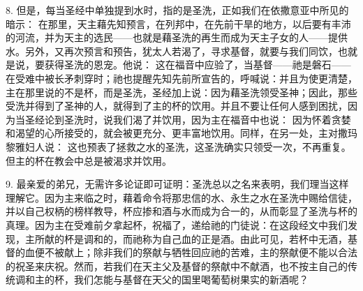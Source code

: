 8. 但是，每当圣经中单独提到水时，指的是圣洗，正如我们在依撒意亚中所见的暗示： 在那里，天主藉先知预言，在列邦中，在先前干旱的地方，以后要有丰沛的河流，并为天主的选民——也就是藉圣洗的再生而成为天主子女的人——提供水。另外，又再次预言和预告，犹太人若渴了，寻求基督，就要与我们同饮，也就是说，要获得圣洗的恩宠。他说： 这在福音中应验了，当基督——祂是磐石——在受难中被长矛刺穿时；祂也提醒先知先前所宣告的，呼喊说：并且为使更清楚，主在那里说的不是杯，而是圣洗，圣经加上说：因为藉圣洗领受圣神；因此，那些受洗并得到了圣神的人，就得到了主的杯的饮用。并且不要让任何人感到困扰，因为当圣经论到圣洗时，说我们渴了并饮用，因为主在福音中也说： 因为怀着贪婪和渴望的心所接受的，就会被更充分、更丰富地饮用。同样，在另一处，主对撒玛黎雅妇人说： 这也预表了拯救之水的圣洗，这圣洗确实只领受一次，不再重复。但主的杯在教会中总是被渴求并饮用。\par

9. 最亲爱的弟兄，无需许多论证即可证明：圣洗总以之名来表明，我们理当这样理解它。因为主来临之时，藉着命令将那忠信的水、永生之水在圣洗中赐给信徒，并以自己权柄的榜样教导，杯应掺和酒与水而成为合一的，从而彰显了圣洗与杯的真理。因为主在受难前夕拿起杯，祝福了，递给祂的门徒说：在这段经文中我们发现，主所献的杯是调和的，而祂称为自己血的正是酒。由此可见，若杯中无酒，基督的血便不被献上；除非我们的祭献与牺牲回应祂的苦难，主的祭献便不能以合法的祝圣来庆祝。然而，若我们在天主父及基督的祭献中不献酒，也不按主自己的传统调和主的杯，我们怎能与基督在天父的国里喝葡萄树果实的新酒呢？\par

